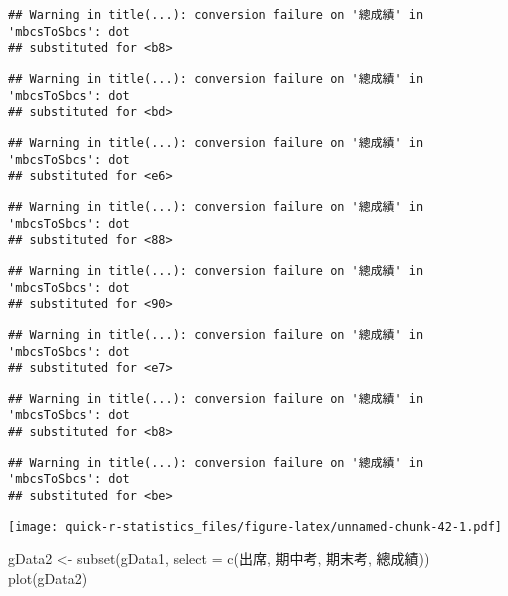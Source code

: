 \documentclass[
]{book}
\newenvironment{Shaded}{\begin{snugshade}}{\end{snugshade}}
\newcommand{\AttributeTok}[1]{\textcolor[rgb]{0.77,0.63,0.00}{#1}}
\newcommand{\FunctionTok}[1]{\textcolor[rgb]{0.00,0.00,0.00}{#1}}
\newcommand{\NormalTok}[1]{#1}
\newcommand{\OtherTok}[1]{\textcolor[rgb]{0.56,0.35,0.01}{#1}}
\begin{document}
\begin{verbatim}
## Warning in title(...): conversion failure on '總成績' in 'mbcsToSbcs': dot
## substituted for <b8>
\end{verbatim}

\begin{verbatim}
## Warning in title(...): conversion failure on '總成績' in 'mbcsToSbcs': dot
## substituted for <bd>
\end{verbatim}

\begin{verbatim}
## Warning in title(...): conversion failure on '總成績' in 'mbcsToSbcs': dot
## substituted for <e6>
\end{verbatim}

\begin{verbatim}
## Warning in title(...): conversion failure on '總成績' in 'mbcsToSbcs': dot
## substituted for <88>
\end{verbatim}

\begin{verbatim}
## Warning in title(...): conversion failure on '總成績' in 'mbcsToSbcs': dot
## substituted for <90>
\end{verbatim}

\begin{verbatim}
## Warning in title(...): conversion failure on '總成績' in 'mbcsToSbcs': dot
## substituted for <e7>
\end{verbatim}

\begin{verbatim}
## Warning in title(...): conversion failure on '總成績' in 'mbcsToSbcs': dot
## substituted for <b8>
\end{verbatim}

\begin{verbatim}
## Warning in title(...): conversion failure on '總成績' in 'mbcsToSbcs': dot
## substituted for <be>
\end{verbatim}

\texttt{[image: quick-r-statistics\_files/figure-latex/unnamed-chunk-42-1.pdf]}

\begin{Shaded}
\begin{Highlighting}[]
\NormalTok{gData2 }\OtherTok{\textless{}{-}} \FunctionTok{subset}\NormalTok{(gData1, }\AttributeTok{select =} \FunctionTok{c}\NormalTok{(出席, 期中考, 期末考, 總成績))}
\FunctionTok{plot}\NormalTok{(gData2)}
\end{Highlighting}
\end{Shaded}
\end{document}
